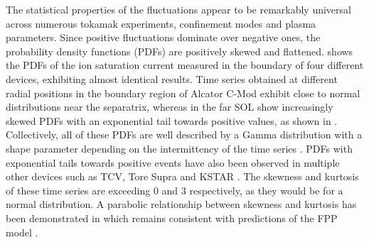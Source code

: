 The statistical properties of the fluctuations appear to be remarkably universal across numerous tokamak experiments, confinement modes and plasma parameters. Since positive fluctuations dominate over negative ones, the probability density functions (PDFs) are positively skewed and flattened.  shows the PDFs of the ion saturation current measured in the boundary of four different devices, exhibiting almost identical results.  Time series obtained at different radial positions in the boundary region of Alcator C-Mod exhibit close to normal distributions near the separatrix, whereas in the far SOL show increasingly skewed PDFs with an exponential tail towards positive values, as shown in . Collectively, all of these PDFs are well described by a Gamma distribution with a shape parameter depending on the intermittency of the time series \cite{theodorsen2017relationship}. PDFs with exponential tails towards positive events have also been observed in multiple other devices such as TCV, Tore Supra and KSTAR \cite{antar2001turbulence,antar2003universality,graves2005self,garcia2007fluctuations,garcia2007collisionality,garcia2009blob,garcia2017sol}. The skewness and kurtosis of these time series are exceeding 0 and 3 respectively, as they would be for a normal distribution. A parabolic relationship between skewness and kurtosis has been demonstrated in  \cite{labit2007universal,sattin2009statistics,sattin2009parabolic} which remains consistent with predictions of the FPP model \cite{garcia2016stochastic}.

